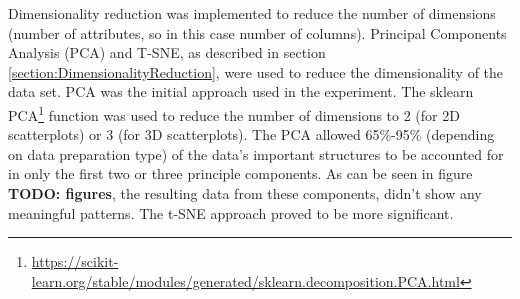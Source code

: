 
Dimensionality reduction was implemented to reduce the number of dimensions (number of attributes, so in this case number of columns). Principal Components Analysis (PCA) and T-SNE, as described in section \ref{section:DimensionalityReduction}, were used to reduce the dimensionality of the data set. PCA was the initial approach used in the experiment. The sklearn PCA\footnote{\url{https://scikit-learn.org/stable/modules/generated/sklearn.decomposition.PCA.html}} function was used to reduce the number of dimensions to 2 (for 2D scatterplots) or 3 (for 3D scatterplots). The PCA allowed 65\%-95\% (depending on data preparation type) of the data's important structures to be accounted for in only the first two or three principle components. As can be seen in figure \textbf{TODO: figures}, the resulting data from these components, didn't show any meaningful patterns. 
The t-SNE approach proved to be more significant.
